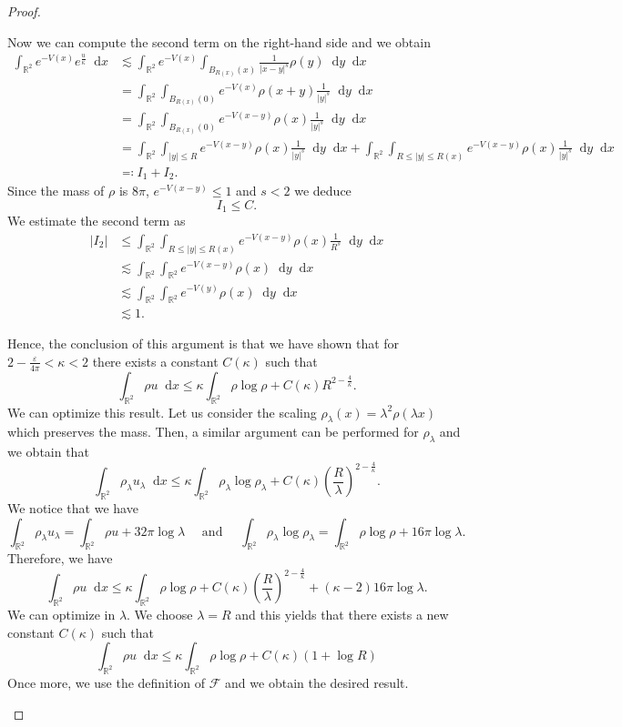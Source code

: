 \documentclass[10pt,a4paper]{amsart}
\newcommand{\R}{{\mathbb{R}}}
\newcommand{\f}{\frac}
\newcommand{\diff}{\mathop{}\!\mathrm{d}}
\theoremstyle{plain}
\theoremstyle{remark}
\begin{document}
\begin{proof}
\begin{enumeratesteps}
Now we can compute the second term on the right-hand side and we obtain 
\begin{align*}
\int_{\R^2}e^{-V(x)}e^{\f{u}{\kappa}}\diff x &\lesssim \int_{\R^2} e^{-V(x)}\int_{B_{R(x)}(x)}\f{1}{|x-y|^s}\rho(y)\diff y\diff x\\
&= \int_{\R^2}\int_{B_{R(x)}(0)} e^{-V(x)}\rho(x+y)\f{1}{|y|^s}\diff y\diff x\\
&= \int_{\R^2}\int_{B_{R(x)}(0)} e^{-V(x-y)}\rho(x)\f{1}{|y|^s}\diff y\diff x\\
&=  \int_{\R^2}\int_{|y|\le R} e^{-V(x-y)}\rho(x)\f{1}{|y|^s}\diff y\diff x + \int_{\R^2}\int_{R\le |y|\le R(x)} e^{-V(x-y)}\rho(x)\f{1}{|y|^s}\diff y\diff x\\
&\eqqcolon I_{1}+ I_{2}.
\end{align*}
Since the mass of $\rho$ is $8\pi$,  $e^{-V(x-y)}\le 1$ and $s<2$ we deduce 
$$
I_{1}\le C. 
$$
We estimate the second term as
\begin{align*}
|I_2| &\le \int_{\R^2}\int_{R\le |y|\le R(x)} e^{-V(x-y)}\rho(x)\f{1}{R^s}\diff y\diff x  \\
&\lesssim \int_{\R^2}\int_{\R^2} e^{-V(x-y)}\rho(x)\diff y\diff x\\
&\lesssim \int_{\R^2}\int_{\R^2} e^{-V(y)}\rho(x)\diff y\diff x\\
&\lesssim 1.
\end{align*}

\fi
%
Hence, the conclusion of this argument is that we have shown that for $2 - \f{\varepsilon}{4\pi}<\kappa<2$ there exists a  constant $C(\kappa)$ such that
$$
\int_{\R^2}\rho u\diff x \le \kappa\int_{\R^2}\rho\log\rho +C(\kappa)R^{2-\frac{4}{\kappa}}. 
$$
We can optimize this result. Let us consider the scaling $\rho_{\lambda}(x)=\lambda^{2}\rho(\lambda x)$ which preserves the mass. Then, a similar argument can be performed for $\rho_{\lambda}$ and we obtain that
$$
    \int_{\R^2}\rho_{\lambda} u_{\lambda}\diff x \le \kappa\int_{\R^2}\rho_\lambda\log\rho_\lambda +C(\kappa)\left(\frac{R}{\lambda}\right)^{2-\frac{4}{\kappa}}. 
$$
We notice that we have
\begin{equation*}
    \int_{\R^2}\rho_{\lambda} u_{\lambda} = \int_{\R^2}\rho u + 32\pi \log\lambda\quad \mbox{ and }\quad\int_{\R^2}\rho_{\lambda}\log\rho_{\lambda}= \int_{\R^2}\rho\log\rho + 16\pi \log\lambda.  
\end{equation*}
Therefore, we have
$$
    \int_{\R^2}\rho u\diff x \le \kappa\int_{\R^2}\rho\log\rho +C(\kappa)\left(\frac{R}{\lambda}\right)^{2-\frac{4}{\kappa}}+(\kappa-2) 16\pi\log\lambda. 
$$
We can optimize  in $\lambda$. We choose $\lambda=R$ and this yields that there exists a new constant $C(\kappa)$ such that 
$$
    \int_{\R^2}\rho u\diff x \le \kappa\int_{\R^2}\rho\log\rho +C(\kappa)(1+\log R)
$$
Once more, we use the definition of $\mathcal F$ and we obtain the desired result. \qedhere
\end{enumeratesteps}
\end{proof}
\end{document}
